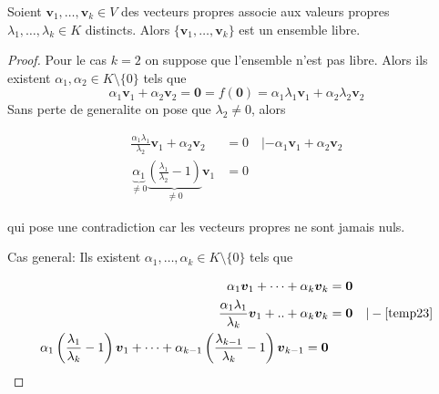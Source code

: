 \begin{theorem}
Soient $\boldsymbol{v}_{1},\dots,\boldsymbol{v}_{k}\in V$ des vecteurs propres associe aux valeurs propres $\lambda_{1},\dots,\lambda _{k}\in K$ distincts. Alors $\{ \boldsymbol{v}_{1},\dots,\boldsymbol{v}_{k} \}$ est un ensemble libre.
\end{theorem}
\begin{proof}
Pour le cas $k=2$ on suppose que l'ensemble n'est pas libre. Alors ils existent $\alpha_{1},\alpha_{2}\in K\setminus \{ 0 \}$ tels que $$\alpha_{1}\boldsymbol{v}_{1}+\alpha_{2}\boldsymbol{v}_{2}=\boldsymbol{0}=f(\boldsymbol{0})=\alpha_{1}\lambda_{1}\boldsymbol{v}_{1}+\alpha_{2}\lambda_{2}\boldsymbol{v}_{2}$$Sans perte de generalite on pose que $\lambda_{2}\neq 0$, alors

\begin{align*}
\frac{\alpha_{1}\lambda_{1}}{\lambda_{2}}\boldsymbol{v}_{1}+\alpha_{2}\boldsymbol{v}_{2} & =0 \quad |-\alpha_{1}\boldsymbol{v}_{1}+\alpha_{2}\boldsymbol{v}_{2} \\
\underbrace{ \alpha_{1} }_{ \neq 0 }\underbrace{ \left( \frac{\lambda_{1}}{\lambda_{2}}-1 \right) }_{ \neq 0 }\boldsymbol{v}_{1} & =0 
\end{align*}

qui pose une contradiction car les vecteurs propres ne sont jamais nuls.

Cas general: Ils existent $\alpha_{1},\dots,\alpha _{k}\in K\setminus \{ 0 \}$ tels que 

\begin{align}
\alpha_{1}\boldsymbol{v}_{1}+\dots+\alpha _{k}\boldsymbol{v}_{k} & =\boldsymbol{0} \label{temp23}\\
\frac{\alpha_{1}\lambda_{1}}{\lambda _{k}}\boldsymbol{v}_{1}+..+\alpha _{k}\boldsymbol{v}_{k} & =\boldsymbol{0}  & |-\ref{temp23}\\
\alpha_{1}\left( \frac{\lambda_{1}}{\lambda _{k}}-1 \right)\boldsymbol{v}_{1}+\dots+\alpha _{k-1}\left( \frac{\lambda_{k-1}}{\lambda _{k}}-1 \right)\boldsymbol{v}_{k-1}=\boldsymbol{0}
\end{align}


\end{proof}


